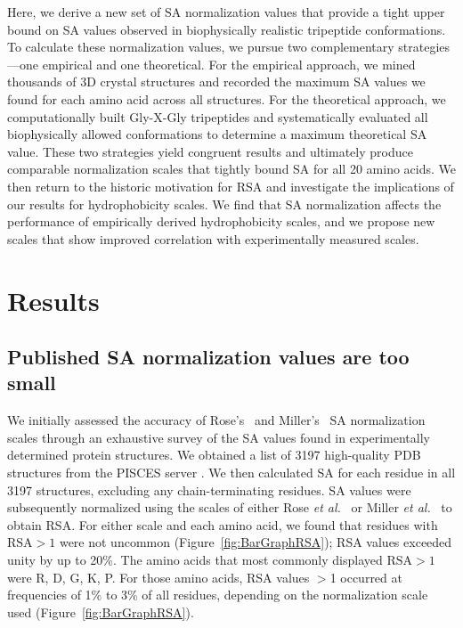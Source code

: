 \documentclass[11pt]{article}
\begin{document}
Here, we derive a new set of SA normalization values that provide a tight upper bound on SA values observed in biophysically realistic tripeptide conformations. To calculate these normalization values, we pursue two complementary strategies---one empirical and one theoretical. For the empirical approach, we mined thousands of 3D crystal structures and recorded the maximum SA values we found for each amino acid across all structures. For the theoretical approach, we computationally built Gly-X-Gly tripeptides and systematically evaluated all biophysically allowed conformations to determine a maximum theoretical SA value. These two strategies yield congruent results and ultimately produce comparable normalization scales that tightly bound SA for all 20 amino acids. We then return to the historic motivation for RSA and investigate the implications of our results for hydrophobicity scales. We find that SA normalization affects the performance of empirically derived hydrophobicity scales, and we propose new scales that show improved correlation with experimentally measured scales.


\section*{Results}

\subsection*{Published SA normalization values are too small}
We initially assessed the accuracy of Rose's~\cite{Rose1985} and Miller's~\cite{Miller1987} SA normalization scales through an exhaustive survey of the SA values found in experimentally determined protein structures. We obtained a list of 3197 high-quality PDB structures from the PISCES server \cite{WangDunbrack2003}. We then calculated SA for each residue in all 3197 structures, excluding any chain-terminating residues. SA values were subsequently normalized using the scales of either Rose \emph{et al.}~\cite{Rose1985} or Miller \emph{et al.}~\cite{Miller1987} to obtain RSA. For either scale and each amino acid, we found that residues with $\text{RSA}>1$ were not uncommon (Figure~\ref{fig:BarGraphRSA}); RSA values exceeded unity by up to 20\%. The amino acids that most commonly displayed $\text{RSA}>1$ were R, D, G, K, P. For those amino acids, RSA values $>$1 occurred at frequencies of 1\% to 3\% of all residues, depending on the normalization scale used (Figure~\ref{fig:BarGraphRSA}).
\end{document}
